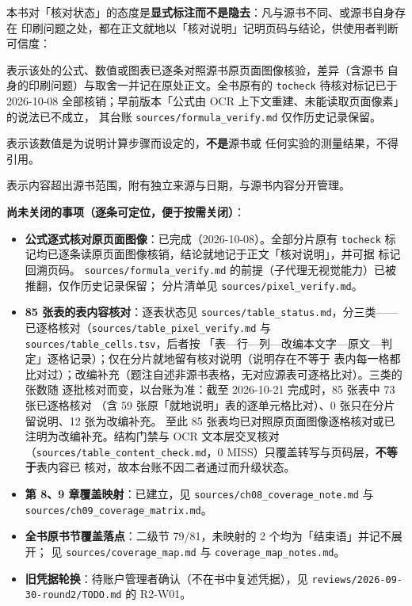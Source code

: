 本书对「核对状态」的态度是\textbf{显式标注而不是隐去}：凡与源书不同、或源书自身存在
印刷问题之处，都在正文就地以「核对说明」记明页码与结论，供使用者判断可信度：

\begin{description}[leftmargin=0pt,style=nextline,font=\heiti]
\item[核对说明] 表示该处的公式、数值或图表已逐条对照源书原页面图像核验，差异（含源书
自身的印刷问题）与取舍一并记在原处正文。全书原有的 \texttt{tocheck} 待核对标记已于
2026-10-08 全部核销；早前版本「公式由 OCR 上下文重建、未能读取页面像素」的说法已不成立，
其台账 \texttt{sources/formula\_verify.md} 仅作历史记录保留。
\item[\pedset{教学设定} 数值] 表示该数值是为说明计算步骤而设定的，\textbf{不是}源书或
任何实验的测量结果，不得引用。
\item[\supp{补充} 内容] 表示内容超出源书范围，附有独立来源与日期，与源书内容分开管理。
\end{description}

\textbf{尚未关闭的事项（逐条可定位，便于按需关闭）}：

\begin{itemize}
\item \textbf{公式逐式核对原页面图像}：已完成（2026-10-08）。全部分片原有 \texttt{tocheck}
标记均已逐条读原页面图像核销，结论就地记于正文「核对说明」，并可据 \src{} 标记回溯页码。
\texttt{sources/formula\_verify.md} 的前提（子代理无视觉能力）已被推翻，仅作历史记录保留；
分片清单见 \texttt{sources/pixel\_verify.md}。
\item \textbf{85 张表的表内容核对}：逐表状态见 \texttt{sources/table\_status.md}，分三类——
已逐格核对（\texttt{sources/table\_pixel\_verify.md} 与 \texttt{sources/table\_cells.tsv}，后者按
「表—行—列—改编本文字—原文—判定」逐格记录）；仅在分片就地留有核对说明（说明存在不等于
表内每一格都比对过）；改编补充（题注自述非源书表格，无对应源表可逐格比对）。三类的张数随
逐批核对而变，以台账为准：截至 2026-10-21 完成时，85 张表中 73 张已逐格核对
（含 59 张原「就地说明」表的逐单元格比对）、0 张只在分片留说明、12 张为改编补充。
至此 85 张表均已对照原页面图像逐格核对或已注明为改编补充。结构门禁与 OCR 文本层交叉核对
（\texttt{sources/table\_content\_check.md}，0 MISS）只覆盖转写与页码层，\textbf{不等于}表内容已
核对，故本台账不因二者通过而升级状态。
\item \textbf{第 8、9 章覆盖映射}：已建立，见 \texttt{sources/ch08\_coverage\_note.md} 与
\texttt{sources/ch09\_coverage\_matrix.md}。
\item \textbf{全书原书节覆盖落点}：二级节 79/81，未映射的 2 个均为「结束语」并记不展开；
见 \texttt{sources/coverage\_map.md} 与 \texttt{coverage\_map\_notes.md}。
\item \textbf{旧凭据轮换}：待账户管理者确认（不在书中复述凭据），见
\texttt{reviews/2026-09-30-round2/TODO.md} 的 R2-W01。
\end{itemize}

